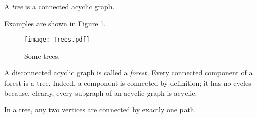 \begin{page}
\setcounter{section}{2}
\setcounter{subsection}{1}
\setcounter{dfn}{1}
\label{portion:247}

\begin{dfn}
A \emph{tree} is a connected acyclic graph.
\end{dfn}

\end{page}

\begin{page}
\setcounter{section}{2}
\setcounter{subsection}{1}
\setcounter{dfn}{1}
\label{portion:248}

Examples are shown in Figure \ref{fig:Trees}.

\begin{figure}[ht]
\begin{center}
\texttt{[image: Trees.pdf]}
\end{center}
\caption{Some trees.}
\label{fig:Trees}
\end{figure}

A disconnected acyclic graph is called a \emph{forest}.
Every connected component of a forest is a tree.
Indeed, a component is connected by definition; it has no cycles because, clearly, every subgraph of an acyclic graph is acyclic.


\end{page}

\begin{page}
\setcounter{section}{2}
\setcounter{subsection}{1}
\setcounter{dfn}{2}
\label{portion:250}

\begin{thm}
In a tree, any two vertices are connected by exactly one path.
\end{thm}

\end{page}

